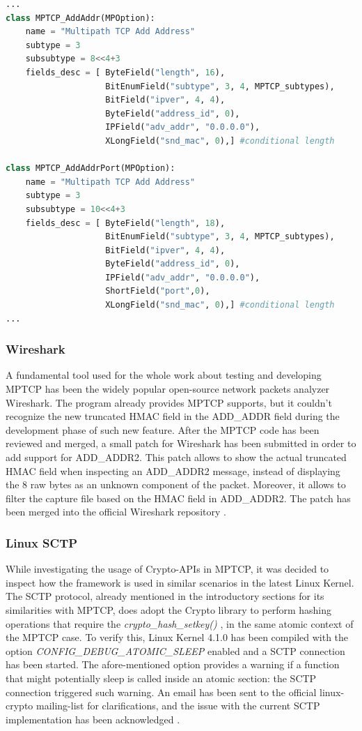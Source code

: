 \begin{lstlisting}[language=Python, caption=Scapy ADD\_ADDR2 class definition, label=scapy2]
...
class MPTCP_AddAddr(MPOption):
    name = "Multipath TCP Add Address"
    subtype = 3
    subsubtype = 8<<4+3
    fields_desc = [ ByteField("length", 16),
                    BitEnumField("subtype", 3, 4, MPTCP_subtypes),
                    BitField("ipver", 4, 4),
                    ByteField("address_id", 0),
                    IPField("adv_addr", "0.0.0.0"),
                    XLongField("snd_mac", 0),] #conditional length

class MPTCP_AddAddrPort(MPOption):
    name = "Multipath TCP Add Address"
    subtype = 3
    subsubtype = 10<<4+3
    fields_desc = [ ByteField("length", 18),
                    BitEnumField("subtype", 3, 4, MPTCP_subtypes),
                    BitField("ipver", 4, 4),
                    ByteField("address_id", 0),
                    IPField("adv_addr", "0.0.0.0"),
                    ShortField("port",0),
                    XLongField("snd_mac", 0),] #conditional length
...
\end{lstlisting}

\subsubsection{Wireshark}
A fundamental tool used for the whole work about testing and developing MPTCP has been the widely popular open-source network packets analyzer Wireshark. The program already provides MPTCP supports, but it couldn't recognize the new truncated HMAC field in the ADD\_ADDR field during the development phase of such new feature. After the MPTCP code has been reviewed and merged, a small patch for Wireshark has been submitted in order to add support for ADD\_ADDR2. This patch allows to show the actual truncated HMAC field when inspecting an ADD\_ADDR2 message, instead of displaying the 8 raw bytes as an unknown component of the packet. Moreover, it allows to filter the capture file based on the HMAC field in ADD\_ADDR2. The patch has been merged into the official Wireshark repository \cite{wireshark}.

\subsubsection{Linux SCTP}
While investigating the usage of Crypto-APIs in MPTCP, it was decided to inspect how the framework is used in similar scenarios in the latest Linux Kernel. The SCTP protocol, already mentioned in the introductory sections for its similarities with MPTCP, does adopt the Crypto library to perform hashing operations that require the \textit{crypto\_hash\_setkey()} \cite{auth751}, in the same atomic context of the MPTCP case. To verify this, Linux Kernel 4.1.0 has been compiled with the option \textit{CONFIG\_DEBUG\_ATOMIC\_SLEEP} enabled and a SCTP connection has been started. The afore-mentioned option provides a warning if a function that might potentially sleep is called inside an atomic section: the SCTP connection triggered such warning. An email has been sent to the official linux-crypto mailing-list for clarifications, and the issue with the current SCTP implementation has been acknowledged \cite{cryptomail}.

